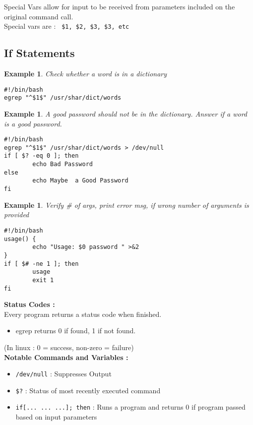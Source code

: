\documentclass{article}
\newtheorem{ex}[theorem]{Example}
\newenvironment{ablock}[1]{%
    \tcolorbox[beamer,%
    noparskip,breakable,
    colback=lightcoral,colframe=darkred,%
    colbacklower=tomato!75!lightcoral,%
    title=#1]}%
    {\endtcolorbox}
\newenvironment{cblock}[1]{%
    \tcolorbox[beamer,%
    noparskip,breakable,
    colback=lightblue,colframe=darkblue,%
    colbacklower=darkblue!75!lightblue,%
    title=#1]}%
    {\endtcolorbox}
\begin{document}
\begin{cblock}{Special vars for scripts}
Special Vars allow for input to be received from parameters included on the original command call. \\
Special vars are : \verb| $1, $2, $3, $3, etc|
\end{cblock}


\subsection{If Statements}
\begin{ex}
Check whether a word is in a dictionary
\begin{lstlisting}
#!/bin/bash 
egrep "^$1$" /usr/shar/dict/words
\end{lstlisting}
\end{ex}

\begin{ex} A good password should not be in the dictionary. Answer if a word is a good  password. 
\begin{lstlisting}
#!/bin/bash 
egrep "^$1$" /usr/shar/dict/words > /dev/null 
if [ $? -eq 0 ]; then 
		echo Bad Password
else 
		echo Maybe  a Good Password
fi
\end{lstlisting}


\end{ex}

\begin{ex}
Verify \# of args, print error msg, if wrong number of arguments is provided
\begin{lstlisting}
#!/bin/bash 
usage() {
		echo "Usage: $0 password " >&2 
}
if [ $# -ne 1 ]; then 
		usage
		exit 1
fi
\end{lstlisting}
\end{ex}

\begin{ablock}{Note}
\textbf{Status Codes :}\\
Every program returns a status code when finished.
\begin{itemize}
\item egrep returns 0 if found, 1 if not found.
\end{itemize}
(In linux : 0 = success, non-zero = failure)\\

\textbf{Notable Commands and Variables :}
\begin{itemize}
\item \verb|/dev/null| : Suppresses Output
\item \verb|$?| : Status of most recently executed command
\item \verb|if[... ... ...]; then| : Runs a program and returns 0 if program passed based on input parameters
\end{itemize}
\end{ablock}
\end{document}
